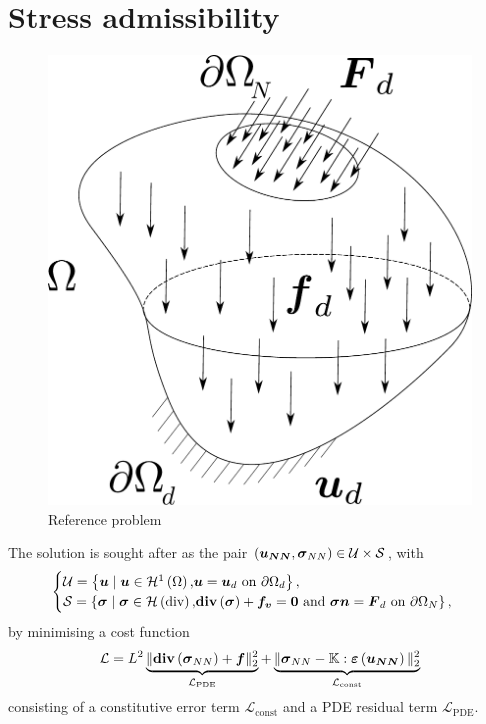 \section{Stress admissibility}
\begin{figure}
	\vspace{-60pt}
	\flushright
	\includegraphics[width=0.6\linewidth]{Figures/Omega.pdf}
	\caption{Reference problem}
	\label{fig:Body}
\end{figure}
The solution is sought after as the pair $\left(\boldsymbol{u_{NN}},\mathcal{\boldsymbol{\sigma}}_{NN}\right) \in \mathcal{U}  \times \mathcal{S}$, with
\begin{equation}
	\begin{cases}
	\mathcal{U} = \left\{\boldsymbol{u} \; | \; \boldsymbol{u}\in \mathcal{H}^1\left(\Omega\right)\text{,} 
	\boldsymbol{u} = \boldsymbol{u}_d \text{ on } \partial \Omega_d \right\}, \\
		\mathcal{S} = \left\{\mathcal{\boldsymbol{\sigma}} \; | \; \mathcal{\boldsymbol{\sigma}}\in \mathcal{H}\left(\text{div}\right)\text{,} \text{\textbf{div}}\left(\mathcal{\boldsymbol{\sigma}}\right)+\boldsymbol{f_v} = \boldsymbol{0}\text{ and }
	\mathcal{\boldsymbol{\sigma}}\boldsymbol{n} = \boldsymbol{F}_d \text{ on } \partial \Omega_N \right\}, 
	\end{cases}
\end{equation}
by minimising a cost function 
\begin{equation*}
	\mathcal{L} = L^2\underbrace{\Vert \text{\textbf{div}}\left(\mathcal{\boldsymbol{\sigma}}_{NN}\right)+\boldsymbol{f}\Vert_2^2}_{\mathcal{L}_{\text{PDE}}} + \underbrace{ \Vert \mathcal{\boldsymbol{\sigma}}_{NN} - \mathbb{K}:\mathcal{\boldsymbol{\varepsilon}}\left(\boldsymbol{u_{NN}}\right) \Vert^2_{2}}_{\mathcal{L}_{\text{const}}}
\end{equation*} consisting of a constitutive error term $\mathcal{L}_{\text{const}}$ and a PDE residual term $\mathcal{L}_{\text{PDE}}$.
